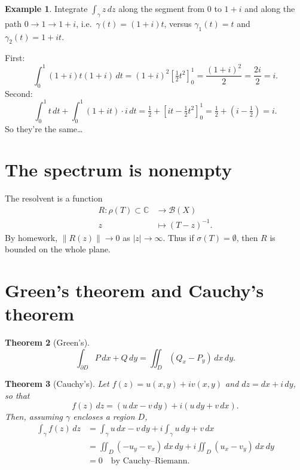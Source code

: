 \documentclass[12pt]{article}
\newcommand{\abs}[1]{\left| #1 \right|}
\newcommand{\norm}[1]{\left\| #1 \right\|}
\newcommand{\C}{\mathbb{C}}
\newcommand{\cB}{\mathcal{B}}
\newtheorem{thm}{Theorem}[section]
\theoremstyle{definition}
\newtheorem{ex}[thm]{Example}
\begin{document}
\begin{ex}
	Integrate $\int_\gamma z \, dz$ along the segment from $0$ to $1+i$ and along the path $0 \to 1 \to 1+i$, i.e.\ $\gamma(t) = (1+i)t$, versus $\gamma_1(t) = t$ and $\gamma_2(t) = 1 + it$.

	First:
	\begin{equation*}
		\int_0^1 (1+i)t (1+i) \, dt = (1+i)^2 \left[ \tfrac{1}{2} t^2 \right]_0^1 = \frac{(1+i)^2}{2} = \frac{2i}{2} = i.
	\end{equation*}
	Second:
	\begin{equation*}
		\int_0^1 t \, dt + \int_0^1 (1+it) \cdot i \, dt = \tfrac{1}{2} + \left[ it - \tfrac{1}{2} t^2 \right]_0^1 = \tfrac{1}{2} + \left( i - \tfrac{1}{2} \right) = i.
	\end{equation*}
	So they're the same\dots
\end{ex}

\section{The spectrum is nonempty}

The resolvent is a function
\begin{align*}
	R : \rho(T) \subset \C &\to \cB(X) \\
	z &\mapsto (T-z)^{-1}.
\end{align*}
By homework, $\norm{R(z)} \to 0$ as $\abs{z} \to \infty$.
Thus if $\sigma(T) = \emptyset$, then $R$ is bounded on the whole plane.

\section{Green's theorem and Cauchy's theorem}

\begin{thm}[Green's]
	\begin{equation*}
		\int_{\partial D} P \, dx + Q \, dy = \iint_D (Q_x - P_y) \, dx \, dy.
	\end{equation*}
\end{thm}

\begin{thm}[Cauchy's]
	Let $f(z) = u(x,y) + i v(x,y)$ and $dz = dx + i \, dy$, so that
	\begin{equation*}
		f(z) \, dz = (u \, dx - v \, dy) + i (u \, dy + v \, dx).
	\end{equation*}
	Then, assuming $\gamma$ encloses a region $D$,
	\begin{align*}
		\int_\gamma f(z) \, dz &= \int_\gamma u \, dx - v \, dy + i \int_\gamma u \, dy + v \, dx \\
		&= \iint_D (-u_y - v_x) \, dx \, dy + i \iint_D (u_x - v_y) \, dx \, dy \\
		&= 0 \quad \text{by Cauchy--Riemann.}
	\end{align*}
\end{thm}
\end{document}
